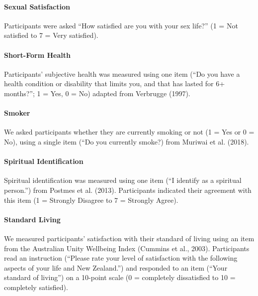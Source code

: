 \documentclass[
  letterpaper,
  DIV=11,
  numbers=noendperiod]{scrartcl}
\let\oldparagraph\paragraph
\renewcommand{\paragraph}[1]{\oldparagraph{#1}\mbox{}}
\begin{document}
\hypertarget{sexual-satisfaction}{%
\paragraph{Sexual Satisfaction}\label{sexual-satisfaction}}

Participants were asked ``How satisfied are you with your sex life?'' (1
= Not satisfied to 7 = Very satisfied).

\hypertarget{short-form-health}{%
\paragraph{Short-Form Health}\label{short-form-health}}

Participants' subjective health was measured using one item (``Do you
have a health condition or disability that limits you, and that has
lasted for 6+ months?''; 1 = Yes, 0 = No) adapted from Verbrugge (1997).

\hypertarget{smoker}{%
\paragraph{Smoker}\label{smoker}}

We asked participants whether they are currently smoking or not (1 = Yes
or 0 = No), using a single item (``Do you currently smoke?) from Muriwai
et al. (2018).

\hypertarget{spiritual-identification}{%
\paragraph{Spiritual Identification}\label{spiritual-identification}}

Spiritual identification was measured using one item (``I identify as a
spiritual person.'') from Postmes et al. (2013). Participants indicated
their agreement with this item (1 = Strongly Disagree to 7 = Strongly
Agree).

\hypertarget{standard-living}{%
\paragraph{Standard Living}\label{standard-living}}

We measured participants' satisfaction with their standard of living
using an item from the Australian Unity Wellbeing Index (Cummins et al.,
2003). Participants read an instruction (``Please rate your level of
satisfaction with the following aspects of your life and New Zealand.'')
and responded to an item (``Your standard of living'') on a 10-point
scale (0 = completely dissatisfied to 10 = completely satisfied).
\end{document}
